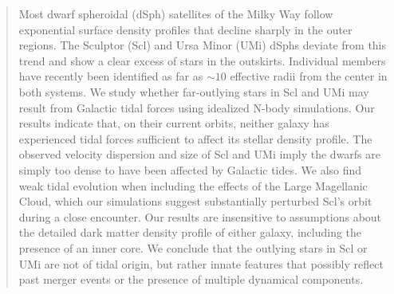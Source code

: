 \documentclass[times,trackchanges, twocolumn, twocolappendix]{aastex701}
\begin{document}
\author[orcid=0009-0008-8903-160X, gname='Daniel', sname='Boyea']{Daniel A. Boyea}


\author[0000-0003-3862-5076, gname='Julio', sname='Navarro']{Julio F. Navarro}

\author[0000-0002-4350-7632, gname='Jaclyn', sname='Jensen']{Jaclyn Jensen}

\author[]{Rapha\"el Errani}



\begin{abstract}
   Most dwarf spheroidal (dSph) satellites  of the Milky Way follow exponential surface density profiles that decline sharply in the outer regions. The Sculptor (Scl) and Ursa Minor (UMi) dSphs deviate from this trend and show a clear excess of stars in the outskirts. Individual members have recently been identified as far as ${\sim}10$ effective radii from the center in both systems.
   We study whether far-outlying stars in Scl and UMi may result from Galactic tidal forces using idealized N-body simulations.
   Our results indicate that, on their current orbits, neither galaxy has experienced tidal forces sufficient to affect its stellar density profile. The observed velocity dispersion and size of Scl and UMi imply the dwarfs are simply too dense to have been affected by Galactic tides. We also find weak tidal evolution when including the effects of the Large Magellanic Cloud, which our simulations suggest substantially perturbed Scl's orbit during a close encounter. Our results are insensitive to assumptions about the detailed dark matter density profile of either galaxy, including the presence of an inner core. 
  We conclude that the outlying stars in Scl or UMi are not of tidal origin, but rather innate features that possibly reflect past merger events or the presence of multiple dynamical components.
\end{abstract}
\end{document}
